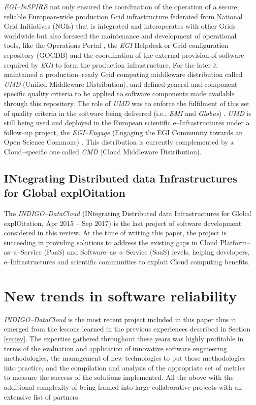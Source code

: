\documentclass[journal]{IEEEtran}
\begin{document}
{\sl EGI--InSPIRE} not only ensured the coordination of the operation of a secure, reliable 
European-wide production Grid infrastructure federated from National Grid Initiatives (NGIs)
that is integrated and interoperates with other Grids worldwide but also foreseed the 
maintenance and development of operational tools, like the Operations Portal \cite{egi-ops}, 
the {\sl EGI} Helpdesk \cite{ggus} or Grid configuration repository (GOCDB) \cite{gocdb} and the 
coordination of the external provision of software required by {\sl EGI} to 
form the production infrastructure. For the later it maintained a production--ready 
Grid computing middleware distribution called {\sl UMD} (Unified Middleware Distribution), and 
defined general and component specific quality criteria to be applied to software 
components made available through this repository.
The role of {\sl UMD} was to enforce the fulfilment of this set of quality
criteria \cite{egi-qc} in the software being delivered (i.e.,
{\sl EMI} and {\sl Globus}) \cite{mario}. {\sl UMD} is still being used and
deployed in the European scientific e--Infrastructures under a follow--up
project, the {\sl EGI--Engage} (Engaging the EGI Community towards an Open Science
Commons) \cite{cordis:egi-engage}. This distribution is currently complemented
by a Cloud--specific one called {\sl CMD} (Cloud Middleware Distribution).

\subsection{INtegrating Distributed data Infrastructures for Global
explOitation}

The {\sl INDIGO--DataCloud} (INtegrating Distributed data Infrastructures for Global
explOitation, Apr 2015 -- Sep 2017) \cite{cordis:indigo} is the last
project of software development considered in this review. At the time of writing
this paper, the project is succeeding in providing solutions to address the existing gaps in
Cloud Platform--as--a--Service (PaaS) and Software--as--a--Service (SaaS) levels,
helping developers, e--Infrastructures and scientific communities to exploit
Cloud computing benefits.

\section{New trends in software reliability}
\label{sec:ntsr}

{\sl INDIGO--DataCloud} is the most recent project included in this paper thus it
emerged from the lessons learned in the previous experiences described in
Section \ref{sec:ev}. The expertise gathered throughout these years was highly
profitable in terms of the evaluation and application of innovative software engineering
methodologies, the management of new technologies to put those methodologies
into practice, and the compilation and analysis of the appropriate set of metrics to measure the
success of the solutions implemented. All the above with the additional complexity of
being framed into large collaborative projects with an extensive list of partners.
\end{document}
